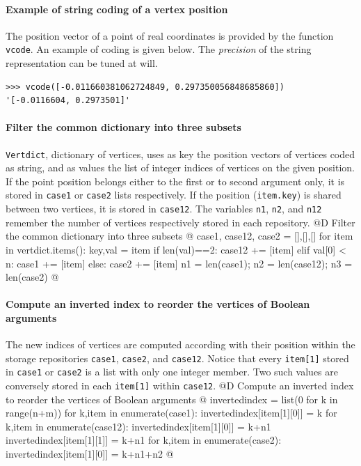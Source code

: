 \documentclass[11pt,oneside]{article}	%
\begin{document}
\paragraph{Example of string coding of a vertex position}
The position vector of a point of real coordinates is provided by the function \texttt{vcode}.
An example of coding is given below. The \emph{precision} of the string representation can be tuned at will.
{\small
\begin{verbatim}
>>> vcode([-0.011660381062724849, 0.297350056848685860])
'[-0.0116604, 0.2973501]'
\end{verbatim}}



\paragraph{Filter the common dictionary into three subsets}
\texttt{Vertdict}, dictionary of vertices, uses as key the position vectors of vertices coded as string, and as values the list of integer indices of vertices on the given position. If the point position belongs either to the first or to second argument only, it is stored in \texttt{case1} or \texttt{case2} lists respectively. If the position (\texttt{item.key}) is shared between two vertices, it is stored in \texttt{case12}.
The variables \texttt{n1}, \texttt{n2}, and \texttt{n12} remember the number of vertices respectively stored in each repository.
@D Filter the common dictionary into three subsets
@{	
	case1, case12, case2 = [],[],[]
	for item in vertdict.items():
		key,val = item
		if len(val)==2:  case12 += [item]
		elif val[0] < n: case1 += [item]
		else: case2 += [item]
	n1 = len(case1); n2 = len(case12); n3 = len(case2)
@}

\paragraph{Compute an inverted index to reorder the vertices of Boolean arguments}
The new indices of vertices are computed according with their position within the storage repositories \texttt{case1}, \texttt{case2}, and \texttt{case12}. Notice that every \texttt{item[1]} stored in \texttt{case1} or \texttt{case2} is a list with only one integer member. Two such values are conversely stored in each \texttt{item[1]} within \texttt{case12}.
@D Compute an inverted index to reorder the vertices of Boolean arguments 
@{
	invertedindex = list(0 for k in range(n+m))
	for k,item in enumerate(case1):
		invertedindex[item[1][0]] = k
	for k,item in enumerate(case12):
		invertedindex[item[1][0]] = k+n1
		invertedindex[item[1][1]] = k+n1
	for k,item in enumerate(case2):
		invertedindex[item[1][0]] = k+n1+n2
@}
\end{document}
